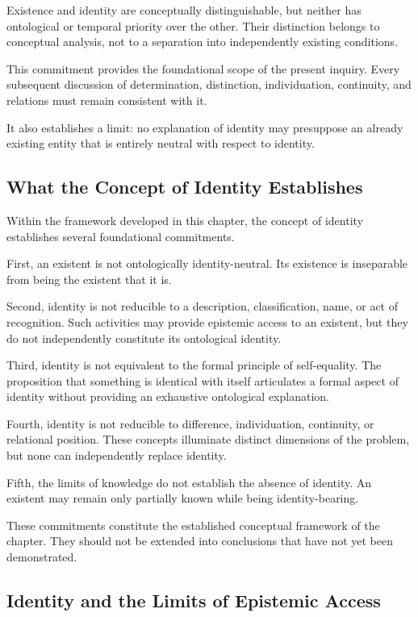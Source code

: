 Existence and identity are conceptually distinguishable, but neither has ontological or temporal priority over the other. Their distinction belongs to conceptual analysis, not to a separation into independently existing conditions.

This commitment provides the foundational scope of the present inquiry. Every subsequent discussion of determination, distinction, individuation, continuity, and relations must remain consistent with it.

It also establishes a limit: no explanation of identity may presuppose an already existing entity that is entirely neutral with respect to identity.

\subsection{What the Concept of Identity Establishes}

Within the framework developed in this chapter, the concept of identity establishes several foundational commitments.

First, an existent is not ontologically identity-neutral. Its existence is inseparable from being the existent that it is.

Second, identity is not reducible to a description, classification, name, or act of recognition. Such activities may provide epistemic access to an existent, but they do not independently constitute its ontological identity.

Third, identity is not equivalent to the formal principle of self-equality. The proposition that something is identical with itself articulates a formal aspect of identity without providing an exhaustive ontological explanation.

Fourth, identity is not reducible to difference, individuation, continuity, or relational position. These concepts illuminate distinct dimensions of the problem, but none can independently replace identity.

Fifth, the limits of knowledge do not establish the absence of identity. An existent may remain only partially known while being identity-bearing.

These commitments constitute the established conceptual framework of the chapter. They should not be extended into conclusions that have not yet been demonstrated.

\subsection{Identity and the Limits of Epistemic Access}

